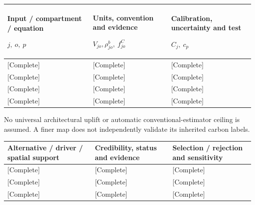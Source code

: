 {\sffamily\fontsize{8.3}{10.3}\selectfont\begin{longtable}{@{}P{54.44mm} P{56.09mm} P{54.44mm}@{}}
\toprule
\textbf{Input / compartment / equation}\par {\normalfont\fontsize{8.2}{10}\selectfont $j,\ o,\ p$} & \textbf{Units, convention and evidence}\par {\normalfont\fontsize{8.2}{10}\selectfont $V_{jo},\rho^b_{jo},\ f^C_{jo}$} & \textbf{Calibration, uncertainty and test}\par {\normalfont\fontsize{8.2}{10}\selectfont $C_j,\ c_p$}\\\midrule\endhead
\rule{0pt}{7.7mm}[Complete] & [Complete] & [Complete]\\\hline
\rule{0pt}{7.7mm}[Complete] & [Complete] & [Complete]\\\hline
\rule{0pt}{7.7mm}[Complete] & [Complete] & [Complete]\\\hline
\rule{0pt}{7.7mm}[Complete] & [Complete] & [Complete]\\\hline
\end{longtable}}
\begin{Notice}No universal architectural uplift or automatic conventional-estimator ceiling is assumed. A finer map does not independently validate its inherited carbon labels.\end{Notice}
{\sffamily\fontsize{8.3}{10.3}\selectfont\begin{longtable}{@{}P{56.09mm} P{54.44mm} P{54.44mm}@{}}
\toprule
\textbf{Alternative / driver / spatial support} & \textbf{Credibility, status and evidence} & \textbf{Selection / rejection and sensitivity}\\\midrule\endhead
\rule{0pt}{7.7mm}[Complete] & [Complete] & [Complete]\\\hline
\rule{0pt}{7.7mm}[Complete] & [Complete] & [Complete]\\\hline
\rule{0pt}{7.7mm}[Complete] & [Complete] & [Complete]\\\hline
\end{longtable}}
